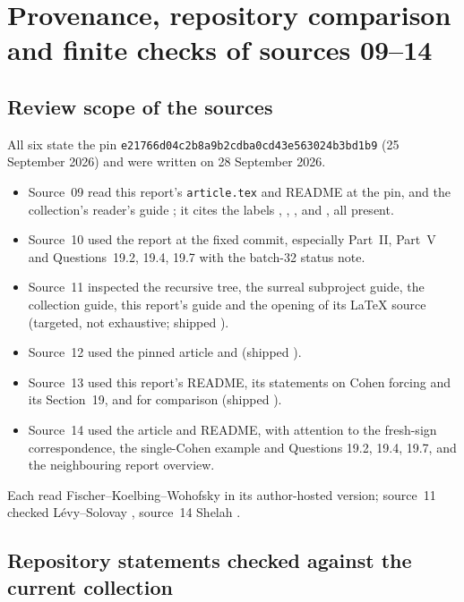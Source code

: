 \documentclass[11pt,letterpaper]{article}
\numberwithin{equation}{section}
\theoremstyle{definition}
\theoremstyle{remark}
\newcommand{\gsfull}{\texttt{e21766d0\allowbreak 4c2b8a9b\allowbreak 2cdba0cd\allowbreak 43e56302\allowbreak 4b3bd1b9}}
\begin{document}
\section{Provenance, repository comparison and finite checks of sources 09--14}\label{univ:gs:sec:audit}

\subsection{Review scope of the sources}

All six state the pin \gsfull{} (25 September 2026) and were written on 28 September 2026.
\begin{itemize}
\item Source~09 read this report's \texttt{article.tex} and README at the pin, and the collection's
reader's guide ; it cites the labels
, , ,
 and , all present.
\item Source~10 used the report at the fixed commit, especially Part~II, Part~V and
Questions~19.2, 19.4, 19.7 with the batch-32 status note.
\item Source~11 inspected the recursive tree, the surreal subproject guide, the collection guide, this
report's guide and the opening of its LaTeX source (targeted, not exhaustive; shipped
).
\item Source~12 used the pinned article and  (shipped
).
\item Source~13 used this report's README, its statements on Cohen forcing and its Section~19, and
 for comparison (shipped
).
\item Source~14 used the article and README, with attention to the fresh-sign correspondence, the
single-Cohen example and Questions 19.2, 19.4, 19.7, and the neighbouring report overview.
\end{itemize}
Each read Fischer--Koelbing--Wohofsky \cite{FKW} in its author-hosted version; source~11 checked
Lévy--Solovay \cite{LevySolovay}, source~14 Shelah \cite{Shelah2000}.

\subsection{Repository statements checked against the current collection}
\end{document}
